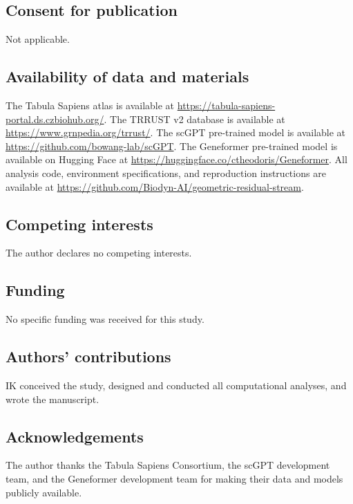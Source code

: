 \documentclass[11pt]{article}
\begin{document}
\subsection*{Consent for publication}
Not applicable.

\subsection*{Availability of data and materials}
The Tabula Sapiens atlas is available at \url{https://tabula-sapiens-portal.ds.czbiohub.org/}.
The TRRUST v2 database is available at \url{https://www.grnpedia.org/trrust/}.
The scGPT pre-trained model is available at \url{https://github.com/bowang-lab/scGPT}.
The Geneformer pre-trained model is available on Hugging Face at \url{https://huggingface.co/ctheodoris/Geneformer}.
All analysis code, environment specifications, and reproduction instructions are available at \url{https://github.com/Biodyn-AI/geometric-residual-stream}.

\subsection*{Competing interests}
The author declares no competing interests.

\subsection*{Funding}
No specific funding was received for this study.

\subsection*{Authors' contributions}
IK conceived the study, designed and conducted all computational analyses, and wrote the manuscript.

\subsection*{Acknowledgements}
The author thanks the Tabula Sapiens Consortium, the scGPT development team, and the Geneformer development team for making their data and models publicly available.
\end{document}
